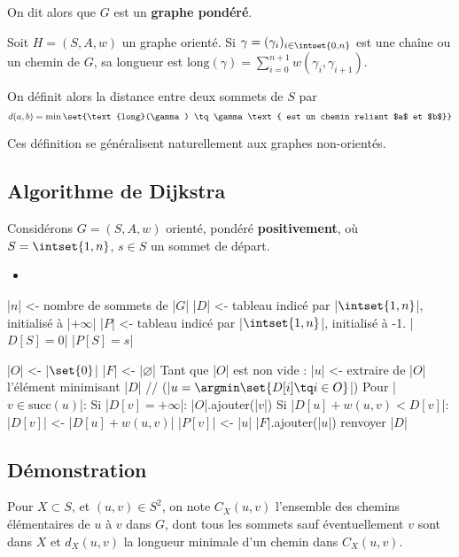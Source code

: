 \documentclass{scrartcl}
\begin{document}
		On dit alors que $G$ est un \textbf{graphe pondéré}.

		 Soit $H = (S,A,w)$ un graphe orienté.
		Si $\gamma = (\gamma_i)_{i\in\intset{0,n}}$ est une chaîne ou un chemin de $G$,
		sa longueur est $\text{long}(\gamma) = \sum_{i=0}^{n+1}w(\gamma_i,\gamma_{i+1})$.

		On définit alors la distance entre deux sommets de $S$ par
		\[
			d(a,b) = \min\set{\text{long}(\gamma) \tq \gamma \text{ est un chemin reliant $a$ et $b$}}
		\]

		\rem Ces définition se généralisent naturellement aux graphes non-orientés.
		
		\subsection{Algorithme de Dijkstra}
			Considérons $G = (S,A,w)$ orienté, pondéré \textbf{positivement}, où $S = \intset{1,n}$, $s \in S$ un sommet de départ. 
			\begin{itemize}
				\item 
			\end{itemize}
			\begin{algotext}
				|$n$| <- nombre de sommets de |$G$|
				|$D$| <- tableau indicé par |$\intset{1,n}$|, initialisé à |$+\infty$|
				|$P$| <- tableau indicé par |$\intset{1,n}$|, initialisé à -1.
				|$D[S] = 0$|
				|$P[S] = s$|

				|$O$| <- |$\set{0}$|
				|$F$| <- |$\varnothing$|
				Tant que |$O$| est non vide :
					|$u$| <- extraire de |$O$| l'élément minimisant |$D$| 		// (|$u = \argmin\set{D[i] \tq i \in O}$|)
					Pour |$v \in \text{succ}(u)$|:
						Si |$D[v] = +\infty$|:
							|$O$|.ajouter(|$v$|)
						Si |$D[u] + w(u,v) < D[v]$|:
							|$D[v]$| <- |$D[u] + w(u,v)$| 
							|$P[v]$| <- |$u$|
					|$F$|.ajouter(|$u$|)
				renvoyer |$D$|
			\end{algotext}

		\subsection{Démonstration}
			 Pour $X \subset S$, et $(u,v) \in S^2$, on note $C_X(u,v)$ l'ensemble des chemins élémentaires de $u$ à $v$ dans $G$,
			dont tous les sommets sauf éventuellement $v$ sont dans $X$ et $d_X(u,v)$ la longueur minimale d'un chemin dans $C_X(u,v)$.
\end{document}
